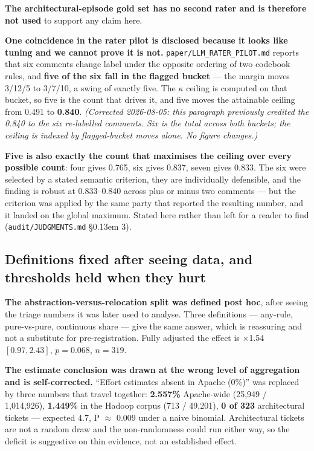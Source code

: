 \documentclass[conference]{IEEEtran}
\begin{document}
\textbf{The architectural-episode gold set has no second rater and is therefore not used} to support any claim here.

\textbf{One coincidence in the rater pilot is disclosed because it looks like tuning and we cannot prove it is not.} \texttt{paper/\allowbreak{}LLM\_\allowbreak{}RATER\_\allowbreak{}PILOT.\allowbreak{}md} reports that six comments change label under the opposite ordering of two codebook rules, and \textbf{five of the six fall in the flagged bucket} --- the margin moves 3/12/5 to 3/7/10, a swing of exactly five. The $\kappa$ ceiling is computed on that bucket, so five is the count that drives it, and five moves the attainable ceiling from 0.491 to \textbf{0.840}. \emph{(Corrected 2026-08-05: this paragraph previously credited the 0.840 to the six re-labelled comments. Six is the total across both buckets; the ceiling is indexed by flagged-bucket moves alone. No figure changes.)}

\textbf{Five is also exactly the count that maximises the ceiling over every possible count}: four gives 0.765, six gives 0.837, seven gives 0.833. The six were selected by a stated semantic criterion, they are individually defensible, and the finding is robust at 0.833--0.840 across plus or minus two comments --- but the criterion was applied by the same party that reported the resulting number, and it landed on the global maximum. Stated here rather than left for a reader to find (\texttt{audit/\allowbreak{}JUDGMENTS.\allowbreak{}md} \S\kern0.13em 3).

\subsection{Definitions fixed after seeing data, and thresholds held when they hurt}
\label{sec:6.6}

\textbf{The abstraction-versus-relocation split was defined post hoc}, after seeing the triage numbers it was later used to analyse. Three definitions --- any-rule, pure-vs-pure, continuous share --- give the same answer, which is reassuring and not a substitute for pre-registration. Fully adjusted the effect is $\times$1.54 $[0.97, 2.43]$, $p=0.068$, $n=319$.

\textbf{The estimate conclusion was drawn at the wrong level of aggregation and is self-corrected.} ``Effort estimates absent in Apache (0\%)'' was replaced by three numbers that travel together: \textbf{2.557\%} Apache-wide (25,949 / 1,014,926), \textbf{1.449\%} in the Hadoop corpus (713 / 49,201), \textbf{0 of 323} architectural tickets --- expected 4.7, P $\approx$ 0.009 under a naive binomial. Architectural tickets are not a random draw and the non-randomness could run either way, so the deficit is suggestive on thin evidence, not an established effect.
\end{document}
